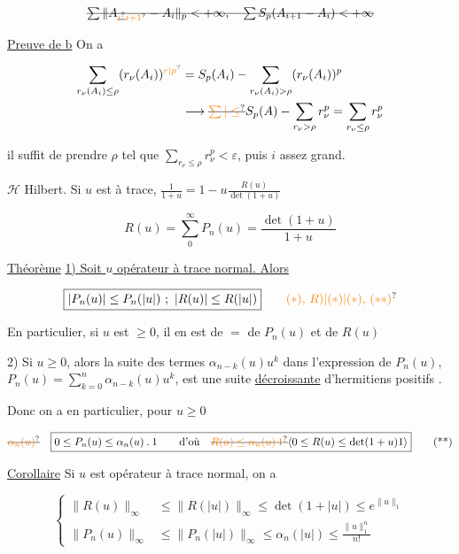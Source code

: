 
\[
\deleted{\sum\|A_{\deleted{\unsure{i}}\unsure{i+1}}-A_i\|_p<+\infty,\quad
\sum S_p(A_{i+1}-A_{i})<+\infty}
\]


\uline{Preuve de b} On a

\[
\begin{aligned}
\sum_{r_\nu(A_i)\leq\rho}(r_\nu(A_i))^{\unsure{r|p}}&=S_p(A_i)-\sum_{r_\nu(A_i)>\rho}(r_\nu(A_i))^p\\
&\longrightarrow\deleted{\unsure{\sum|\leq}} S_p(A)-\sum_{r_\nu>\rho}r_\nu^p=\sum_{r_\nu\leq\rho}r_\nu^p
\end{aligned}
\]

il suffit de prendre $\rho$ tel que $\sum_{r_\nu\leq\rho}r_\nu^p<\varepsilon$, puis $i$ assez grand.

$\mathscr H$ Hilbert. Si $u$ est à trace, $\frac1{1+u}=1-u\frac{R(u)}{\det(1+u)}$

\[
R(u)=\sum_0^\infty P_n(u)=\frac{\det(1+u)}{1+u}
\]

\uline{Théorème} \uline{1) Soit $u$ opérateur  à trace normal. Alors}

\[
\boxed{|P_n(u)|\leq P_n(|u|)\ ;\ |R(u)|\leq R(|u|)}\tag*{\unsure{$(*),\,R)$|$(*)$|$(*),\,({**})$}}
\]

En particulier, si $u$ est $\geq0$, il en est de $=$ de $P_n(u)$ et de $R(u)$

2) Si $u\geq0$, alors la suite des termes $\alpha_{n-k}(u)u^k$ dans l'expression de $P_n(u)$, $P_n(u)=\sum_{k=0}^n\alpha_{n-k}(u)u^k$, est une suite \uline{décroissante} d'hermitiens positifs .

Donc on a en particulier, pour $u\geq0$

\[
\deleted{\unsure{\alpha_n(u)}}\quad
\boxed{0\leq P_n(u)\leq\alpha_n(u)\mathbin{.}1\qquad\text{d'où}\quad
\deleted{\unsure{R(u)\leq\alpha_n(u)\,1}}\inserted{0\leq R(u)\leq\det(1+u)1}}\tag*{(**)}
\]

 \uline{Corollaire} Si $u$ est opérateur  à trace normal, on a

\[
\left\{\begin{aligned}
\|R(u)\|_\infty&\leq\|R(|u|)\|_\infty\leq\det(1+|u|)\leq e^{\|u\|_1}\\
\|P_n(u)\|_\infty&\leq\|P_n(|u|)\|_\infty\leq\alpha_n(|u|)\leq\frac{\|u\|_1^n}{n!}
\end{aligned}\right.\tag*{(***)}
\]

